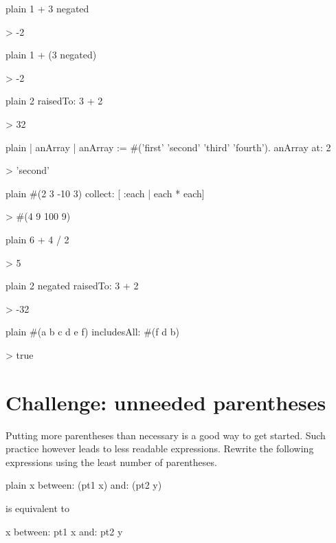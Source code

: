 \documentclass[10pt,twoside,english]{_support/latex/sbabook/sbabook}
\begin{document}
\begin{displaycode}{plain}
1 + 3 negated

> -2
\end{displaycode}

\begin{displaycode}{plain}
1 + (3 negated)

> -2
\end{displaycode}

\begin{displaycode}{plain}
2 raisedTo: 3 + 2

> 32
\end{displaycode}

\begin{displaycode}{plain}
| anArray |
anArray := #('first' 'second' 'third' 'fourth').
anArray at: 2


> 'second'
\end{displaycode}

\begin{displaycode}{plain}
#(2 3 -10 3) collect: [ :each | each * each]

> #(4 9 100 9)
\end{displaycode}

\begin{displaycode}{plain}
6 + 4 / 2

> 5
\end{displaycode}

\begin{displaycode}{plain}
2 negated raisedTo: 3 + 2

> -32
\end{displaycode}

\begin{displaycode}{plain}
#(a b c d e f) includesAll: #(f d b)

> true
\end{displaycode}
\section{Challenge: unneeded parentheses }
Putting more  parentheses than necessary is  a good way  to get started. Such  practice however leads to  less readable expressions. Rewrite the following expressions using the least number of parentheses. 

\begin{displaycode}{plain}
x between: (pt1 x) and: (pt2 y)

is equivalent to 

x between: pt1 x and: pt2 y
\end{displaycode}
\end{document}
